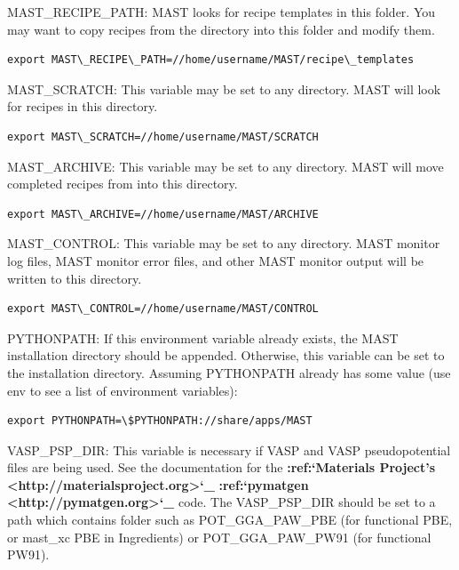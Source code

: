 \documentclass[letterpaper,10pt,english]{sphinxmanual}
\begin{document}
MAST\_RECIPE\_PATH: MAST looks for recipe templates in this folder. You may want to copy recipes from the  directory into this folder and modify them.

\begin{Verbatim}[commandchars=\\\{\}]
export MAST\_RECIPE\_PATH=//home/username/MAST/recipe\_templates
\end{Verbatim}

MAST\_SCRATCH: This variable may be set to any directory. MAST will look for recipes in this directory.

\begin{Verbatim}[commandchars=\\\{\}]
export MAST\_SCRATCH=//home/username/MAST/SCRATCH
\end{Verbatim}

MAST\_ARCHIVE: This variable may be set to any directory. MAST will move completed recipes from  into this directory.

\begin{Verbatim}[commandchars=\\\{\}]
export MAST\_ARCHIVE=//home/username/MAST/ARCHIVE
\end{Verbatim}

MAST\_CONTROL: This variable may be set to any directory. MAST monitor log files, MAST monitor error files, and other MAST monitor output will be written to this directory.

\begin{Verbatim}[commandchars=\\\{\}]
export MAST\_CONTROL=//home/username/MAST/CONTROL
\end{Verbatim}

PYTHONPATH: If this environment variable already exists, the MAST installation directory should be appended. Otherwise, this variable can be set to the installation directory. Assuming PYTHONPATH already has some value (use env to see a list of environment variables):

\begin{Verbatim}[commandchars=\\\{\}]
export PYTHONPATH=\$PYTHONPATH://share/apps/MAST
\end{Verbatim}

VASP\_PSP\_DIR: This variable is necessary if VASP and VASP pseudopotential files are being used. See the documentation for the {\color{red}\bfseries{}:ref:{}`Materials Project's \textless{}http://materialsproject.org\textgreater{}{}`\_} {\color{red}\bfseries{}:ref:{}`pymatgen \textless{}http://pymatgen.org\textgreater{}{}`\_} code. The VASP\_PSP\_DIR should be set to a path which contains folder such as POT\_GGA\_PAW\_PBE (for functional PBE, or mast\_xc PBE in Ingredients) or POT\_GGA\_PAW\_PW91 (for functional PW91).
\end{document}
